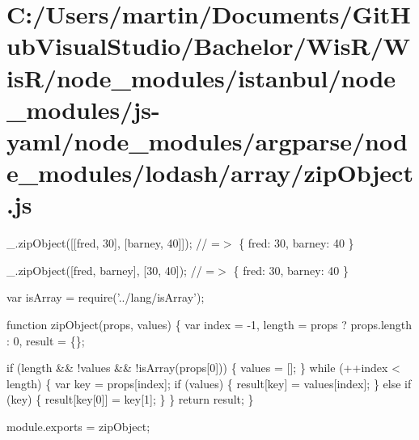 \hypertarget{_c_1_2_users_2martin_2_documents_2_git_hub_visual_studio_2_bachelor_2_wis_r_2_wis_r_2node_modulec2e82c9d6cec3461910a097dc32c5509}{}\section{C\+:/\+Users/martin/\+Documents/\+Git\+Hub\+Visual\+Studio/\+Bachelor/\+Wis\+R/\+Wis\+R/node\+\_\+modules/istanbul/node\+\_\+modules/js-\/yaml/node\+\_\+modules/argparse/node\+\_\+modules/lodash/array/zip\+Object.\+js}
\+\_\+.\+zip\+Object(\mbox{[}\mbox{[}\textquotesingle{}fred\textquotesingle{}, 30\mbox{]}, \mbox{[}\textquotesingle{}barney\textquotesingle{}, 40\mbox{]}\mbox{]}); // =$>$ \{ \textquotesingle{}fred\textquotesingle{}\+: 30, \textquotesingle{}barney\textquotesingle{}\+: 40 \}

\+\_\+.\+zip\+Object(\mbox{[}\textquotesingle{}fred\textquotesingle{}, \textquotesingle{}barney\textquotesingle{}\mbox{]}, \mbox{[}30, 40\mbox{]}); // =$>$ \{ \textquotesingle{}fred\textquotesingle{}\+: 30, \textquotesingle{}barney\textquotesingle{}\+: 40 \}


\begin{DoxyCodeInclude}
var isArray = require(\textcolor{stringliteral}{'../lang/isArray'});

\textcolor{keyword}{function} zipObject(props, values) \{
  var index = -1,
      length = props ? props.length : 0,
      result = \{\};

  \textcolor{keywordflow}{if} (length && !values && !isArray(props[0])) \{
    values = [];
  \}
  \textcolor{keywordflow}{while} (++index < length) \{
    var key = props[index];
    \textcolor{keywordflow}{if} (values) \{
      result[key] = values[index];
    \} \textcolor{keywordflow}{else} \textcolor{keywordflow}{if} (key) \{
      result[key[0]] = key[1];
    \}
  \}
  \textcolor{keywordflow}{return} result;
\}

module.exports = zipObject;
\end{DoxyCodeInclude}
 
